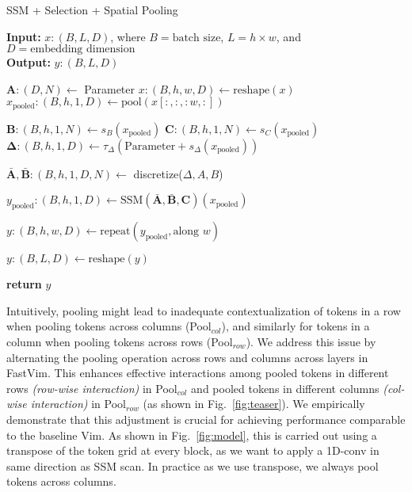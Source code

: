 \begin{algorithm}
\caption{SSM + Selection + Spatial Pooling}
\textbf{Input:} $x : (B,L,D)$,  where $B = \text{batch size}$, $L = h \times w$, and $D = \text{embedding dimension}$ \\
\textbf{Output:} $y : (B,L,D)$
\begin{algorithmic}[1]
    \State $\textbf{A} : (D,N) \gets$ Parameter
    \Statex {}
    \State $x : (B,h,w,D) \gets \text{reshape}(x)$
    \State $x_{\text{pooled}} : (B,h,1,D) \gets  \text{pool}(\textbf{$x$}[:, :, :w, :])$ 
    \Statex {}

    \State $\boldsymbol{B} : (B,h,1,N) \gets s_B(x_{\text{pooled}})$
    \State $\boldsymbol{C} : (B,h,1,N) \gets s_C(x_{\text{pooled}})$
    \State $\boldsymbol{\Delta} : (B,h,1,D) \gets \tau_\Delta(\text{Parameter} + s_\Delta(x_{\text{pooled}}))$
    
    
    \State $\bar{\textbf{A}}, \bar{\textbf{B}} : (B,h,1,D,N) \gets$ discretize($\Delta, A, B$)
    
    \State $y_{\text{pooled}} : (B,h,1,D) \gets \text{SSM}(\bar{\textbf{A}}, \bar{\textbf{B}}, \textbf{C})(x_{\text{pooled}})$
    \Statex {}

    \State $y : (B,h,w,D) \gets \text{repeat}(y_{\text{pooled}}, \text{along } w)$

    \State $y : (B,L,D) \gets \text{reshape}(y)$
    
    \State \textbf{return} $y$
\end{algorithmic}
\end{algorithm}


Intuitively, pooling might lead to inadequate contextualization of tokens in a row when pooling tokens across columns (Pool$_{col}$), and similarly for tokens in a column when pooling tokens across rows (Pool$_{row}$). We address this issue by alternating the pooling operation across rows and columns across layers in FastVim. This enhances effective interactions among pooled tokens in different rows \textit{(row-wise interaction)} in Pool$_{col}$ and pooled tokens in different columns \textit{(col-wise interaction)} in Pool$_{row}$ (as shown in Fig.~\ref{fig:teaser}). We empirically demonstrate that this adjustment is crucial for achieving performance comparable to the baseline Vim. As shown in Fig.~\ref{fig:model}, this is carried out using a transpose of the token grid at every block, as we want to apply a 1D-conv in same direction as SSM scan. In practice as we use transpose, we always pool tokens across columns. 




